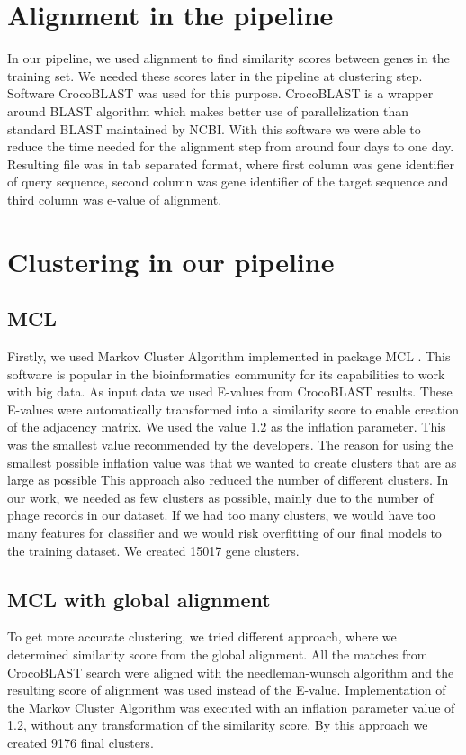 \section{Alignment in the pipeline}
In our pipeline, we used alignment to find similarity scores between genes in the training set.
We needed these scores later in the pipeline at clustering step.
Software CrocoBLAST \cite{} was used for this purpose.
CrocoBLAST is a wrapper around BLAST algorithm which makes better use of parallelization than standard BLAST maintained by NCBI.
With this software we were able to reduce the time needed for the alignment step from around four days to one day.
Resulting file was in tab separated format, where first column was gene identifier of query sequence, second column was gene identifier of the target sequence and third column was e-value of alignment.

\section{Clustering in our pipeline}
\subsection{MCL}
Firstly, we used Markov Cluster Algorithm implemented in package MCL \cite{mcl}.
This software is popular in the bioinformatics community for its capabilities to work with big data.
As input data we used E-values from CrocoBLAST results.
These E-values were automatically transformed into a similarity score to enable creation of the adjacency matrix.
We used the value 1.2 as the inflation parameter.
This was the smallest value recommended by the developers.
The reason for using the smallest possible inflation value was that we wanted to create clusters that are as large as possible
This approach also reduced the number of different clusters.
In our work, we needed as few clusters as possible, mainly due to the number of phage records in our dataset.
If we had too many clusters, we would have too many features for classifier and we would risk overfitting of our final models to the training dataset.
We created 15017 gene clusters.

\subsection{MCL with global alignment}
To get more accurate clustering, we tried different approach, where we determined similarity score from the global alignment.
All the matches from CrocoBLAST search were aligned with the needleman-wunsch algorithm \cite{needleman-wunsch} and the resulting score of alignment was used instead of the E-value.
Implementation of the Markov Cluster Algorithm was executed with an inflation parameter value of 1.2, without any transformation of the similarity score.
By this approach we created 9176 final clusters.

